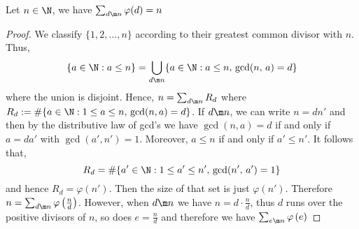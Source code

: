 \begin{nprop}
   Let $n \in \N$, we have $\sum_{d \m n} \varphi(d) = n$
\end{nprop}
\begin{proof}
  We classify $\{1, 2,\dots, n\}$ according to their greatest common divisor with $n$. Thus,
  $$ \{a \in \N : a \le n\} = \bigcup_{d \m n} \{a \in \N : a\le n,\, \gcd(n,\, a) = d\} $$
  where the union is disjoint. Hence, $n = \sum_{d \m n} R_d$ where $R_d := \#\{a \in \N : 1 \le a \le n,\, \gcd(n, a) = d\}$. If $d \m n$, we can write $n = dn'$ and then by the distributive law of gcd's we have $\gcd(n, a) = d$ if and only if $a = da'$ with $\gcd(a', n') = 1$. Moreover, $a \le n$ if and only if $a' \le n'$. It follows that,
  $$ R_d = \#\{a' \in \N: 1 \le a' \le n',\, \gcd(n',\, a') = 1\} $$
  and hence $R_d = \varphi(n')$. Then the size of that set is just $\varphi(n')$. Therefore $n = \sum_{d\m n} \varphi\left(\frac{n}{d}\right)$. However, when $d \m n$ we have $n = d \cdot \frac{n}{d}$, thus $d$ runs over the positive divisors of $n$, so does $e = \frac{n}{d}$ and therefore we have $\sum_{e \m n} \varphi\left( e \right)$
\end{proof}
